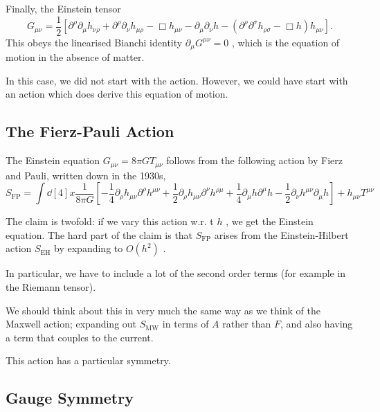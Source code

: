Finally, the Einstein tensor
\begin{equation}
  G_{\mu\nu} = \frac{1}{2} \left[ \partial^{\rho} \partial_{\mu} h_{\nu\rho} + \partial^{\rho} \partial_{\nu} h_{\mu\rho} - \Box h_{\mu\nu} - \partial_{\mu} \partial_{\nu} h - (\partial^{\rho} \partial^{\sigma} h_{\rho\sigma} - \Box h) h_{\mu\nu} \right].
\end{equation}
This obeys the linearised Bianchi identity $\partial_{\mu} G^{\mu\nu} = 0$ , which is the equation of motion in the absence of matter.

In this case, we did not start with the action. However, we could have start with an action which does derive this equation of motion.

\subsection{The Fierz-Pauli Action}%
\label{sub:the_fierz_pauli_action}

The Einstein equation $G_{\mu\nu} = 8 \pi G T_{\mu\nu}$  follows from the following action by Fierz and Pauli, written down in the 1930s, 
\begin{equation}
  S_{\text{FP}} = \int \dd[4]{x} \frac{1}{8\pi G} \left[ - \frac{1}{4} \partial_{\rho} h_{\mu\nu} \partial^{\rho} h^{\mu\nu} + \frac{1}{2} \partial_{\rho} h_{\mu\nu} \partial^{\nu} h^{\rho\mu} + \frac{1}{4} \partial_{\mu} h \partial^{\mu} h - \frac{1}{2} \partial_{\nu} h^{\mu\nu} \partial_{\mu} h \right] + h_{\mu\nu} T^{\mu\nu}
\end{equation}

The claim is twofold: if we vary this action w.r. t $h$ , we get the Einstein equation. The hard part of the claim is that $S_{\text{FP}}$  arises from the Einstein-Hilbert action $S_{\text{EH}}$  by expanding to $O(h^2)$ .

In particular, we have to include a lot of the second order terms (for example in the Riemann tensor).

We should think about this in very much the same way as we think of the Maxwell action; expanding out $S_{\text{MW}}$  in terms of $A$ rather than  $F$, and also having a term that couples to the current.

This action has a particular symmetry.

\subsection{Gauge Symmetry}%
\label{sub:gauge_symmetry}

